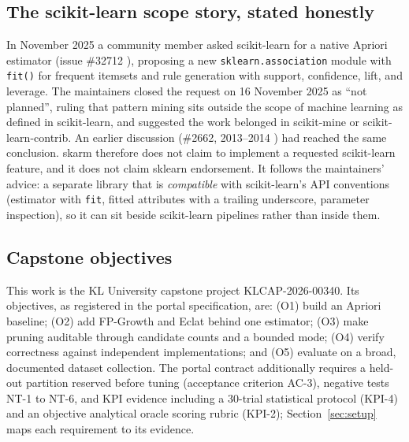 \documentclass[journal,a4paper]{IEEEtran}
\newcommand{\skarm}{skarm\xspace}
\begin{document}
\subsection{The scikit-learn scope story, stated honestly}
In November 2025 a community member asked scikit-learn for a native
Apriori estimator (issue \#32712 \cite{sklearn32712}), proposing a new
\texttt{sklearn.association} module with \texttt{fit()} for frequent
itemsets and rule generation with support, confidence, lift, and
leverage. The maintainers closed the request on 16 November 2025 as
``not planned'', ruling that pattern mining sits outside the scope of
machine learning as defined in scikit-learn, and suggested the work
belonged in scikit-mine or scikit-learn-contrib. An earlier discussion
(\#2662, 2013--2014 \cite{sklearn2662}) had reached the same conclusion. \skarm therefore
does not claim to implement a requested scikit-learn feature, and it
does not claim sklearn endorsement. It follows the maintainers' advice:
a separate library that is \emph{compatible} with scikit-learn's API
conventions (estimator with \texttt{fit}, fitted attributes with a
trailing underscore, parameter inspection), so it can sit beside
scikit-learn pipelines rather than inside them.

\subsection{Capstone objectives}
This work is the KL University capstone project KLCAP-2026-00340. Its
objectives, as registered in the portal specification, are: (O1) build
an Apriori baseline; (O2) add FP-Growth and Eclat behind one estimator;
(O3) make pruning auditable through candidate counts and a bounded
mode; (O4) verify correctness against independent implementations; and
(O5) evaluate on a broad, documented dataset collection. The portal
contract additionally requires a held-out partition reserved before
tuning (acceptance criterion AC-3), negative tests NT-1 to NT-6, and
KPI evidence including a 30-trial statistical protocol (KPI-4) and an
objective analytical oracle scoring rubric (KPI-2); Section~\ref{sec:setup} maps each
requirement to its evidence.
\end{document}
